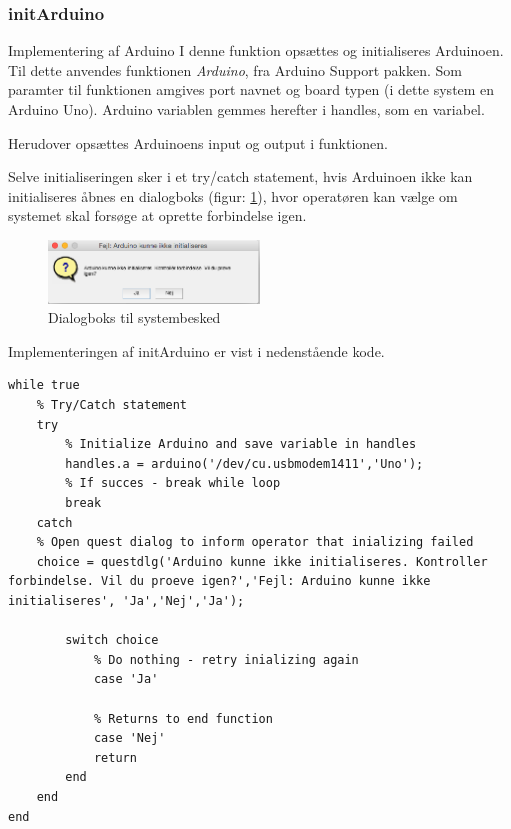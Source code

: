 \subsubsection{initArduino}
Implementering af Arduino
I denne funktion opsættes og initialiseres Arduinoen. Til dette anvendes funktionen \textit{Arduino}, fra Arduino Support pakken. Som paramter til funktionen amgives port navnet og board typen (i dette system en Arduino Uno). Arduino variablen gemmes herefter i handles, som en variabel.

Herudover opsættes Arduinoens input og output i funktionen. 

Selve initialiseringen sker i et try/catch statement, hvis Arduinoen ikke kan initialiseres åbnes en dialogboks (figur: \ref{fig:initArduino}), hvor operatøren kan vælge om systemet skal forsøge at oprette forbindelse igen. 

\begin{figure}[H]
	\centering
	\includegraphics[width=0.5\textwidth]{billeder/software/initArduino.png}
	\caption{Dialogboks til systembesked}
	\label{fig:initArduino}
\end{figure}

Implementeringen af initArduino er vist i nedenstående kode.
\begin{lstlisting} 
while true
    % Try/Catch statement
    try
        % Initialize Arduino and save variable in handles
        handles.a = arduino('/dev/cu.usbmodem1411','Uno');
        % If succes - break while loop
        break
    catch
    % Open quest dialog to inform operator that inializing failed    
    choice = questdlg('Arduino kunne ikke initialiseres. Kontroller forbindelse. Vil du proeve igen?','Fejl: Arduino kunne ikke initialiseres', 'Ja','Nej','Ja');

        switch choice
            % Do nothing - retry inializing again
            case 'Ja'
        
            % Returns to end function
            case 'Nej'
            return
        end
    end
end
\end{lstlisting} 
